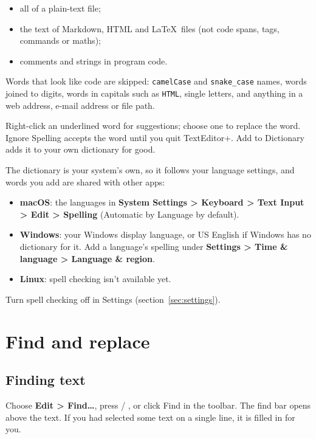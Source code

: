 \documentclass[11pt,a4paper]{article}
\newcommand{\appname}{TextEditor+}
\newcommand{\menu}[1]{\textsf{\textbf{#1}}}
\newcommand{\ui}[1]{\textsf{#1}}
\begin{document}
\begin{itemize}
  \item all of a plain-text file;
  \item the text of Markdown, HTML and \LaTeX\ files (not code spans, tags,
        commands or maths);
  \item comments and strings in program code.
\end{itemize}

Words that look like code are skipped: \texttt{camelCase} and
\texttt{snake\_case} names, words joined to digits, words in capitals such as
\texttt{HTML}, single letters, and anything in a web address, e-mail address or
file path.

Right-click an underlined word for suggestions; choose one to replace the
word. \ui{Ignore Spelling} accepts the word until you quit \appname.
\ui{Add to Dictionary} adds it to your own dictionary for good.

The dictionary is your system's own, so it follows your language settings, and
words you add are shared with other apps:

\begin{itemize}
  \item \textbf{macOS}: the languages in \menu{System Settings > Keyboard >
        Text Input > Edit > Spelling} (\ui{Automatic by Language} by default).
  \item \textbf{Windows}: your Windows display language, or US English if
        Windows has no dictionary for it. Add a language's spelling under
        \menu{Settings > Time \& language > Language \& region}.
  \item \textbf{Linux}: spell checking isn't available yet.
\end{itemize}

Turn spell checking off in Settings (section~\ref{sec:settings}).

\section{Find and replace}\label{sec:find}

\subsection{Finding text}

Choose \menu{Edit > Find…}, press  / , or click \ui{Find}
in the toolbar. The find bar opens above the text. If you had selected some text
on a single line, it is filled in for you.
\end{document}
